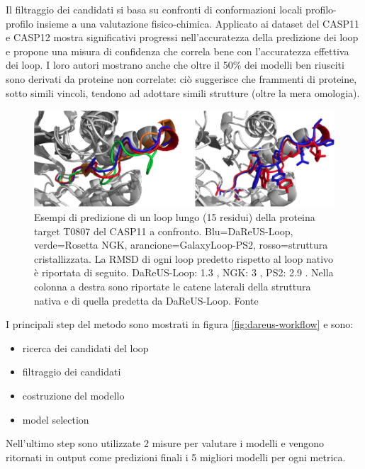 {{Il filtraggio dei candidati si basa su confronti di conformazioni locali profilo-profilo insieme a una valutazione fisico-chimica. Applicato ai dataset del CASP11 e CASP12 mostra significativi progressi nell'accuratezza della predizione dei loop e propone una misura di confidenza che correla bene con l'accuratezza effettiva dei loop. I loro autori mostrano anche che oltre il 50\% dei modelli ben riusciti sono derivati da proteine non correlate: ciò suggerisce che frammenti di proteine, sotto simili vincoli, tendono ad adottare simili strutture (oltre la mera omologia)\supercite{karami2018dareus}. 

\begin{figure}[!htb]
	\centering
	\includegraphics[scale=0.63]{images/dareus-confronto.png}
	\caption{Esempi di predizione di un loop lungo (15 residui) della proteina target T0807 del CASP11 a confronto. Blu=DaReUS-Loop, verde=Rosetta NGK, arancione=GalaxyLoop-PS2, rosso=struttura cristallizzata. La RMSD di ogni loop predetto rispetto al loop nativo è riportata di seguito. DaReUS-Loop: 1.3 \angstrom, NGK: 3 \angstrom, PS2: 2.9 \angstrom. Nella colonna a destra sono riportate le catene laterali della struttura nativa e di quella predetta da DaReUS-Loop. Fonte\cite{karami2018dareus}}
	\label{fig:loop-prediction-lungo}
\end{figure}

I principali step del metodo sono mostrati in figura \ref{fig:dareus-workflow} e sono:
\begin{itemize}
	\item ricerca dei candidati del loop
	\item filtraggio dei candidati
	\item costruzione del modello
	\item model selection
\end{itemize}

Nell'ultimo step sono utilizzate 2 misure per valutare i modelli e vengono ritornati in output come predizioni finali i 5 migliori modelli per ogni metrica.



}}
